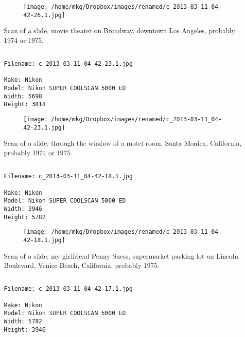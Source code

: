 \begin{figure}
\texttt{[image: /home/mkg/Dropbox/images/renamed/c\_2013-03-11\_04-42-26.1.jpg]}
\end{figure}
    
\clearpage
\onecolumn
\noindent Scan of a slide, movie theater on Broadway, downtown Los Angeles, probably 1974 or 1975.
\noindent
\begin{lstlisting}

Filename: c_2013-03-11_04-42-23.1.jpg

Make: Nikon
Model: Nikon SUPER COOLSCAN 5000 ED
Width: 5698
Height: 3818
\end{lstlisting}
\clearpage

\begin{figure}
\texttt{[image: /home/mkg/Dropbox/images/renamed/c\_2013-03-11\_04-42-23.1.jpg]}
\end{figure}
    
\clearpage
\onecolumn
\noindent Scan of a slide, through the window of a motel room, Santa Monica, California, probably 1974 or 1975.
\noindent
\begin{lstlisting}

Filename: c_2013-03-11_04-42-18.1.jpg

Make: Nikon
Model: Nikon SUPER COOLSCAN 5000 ED
Width: 3946
Height: 5782
\end{lstlisting}
\clearpage

\begin{figure}
\texttt{[image: /home/mkg/Dropbox/images/renamed/c\_2013-03-11\_04-42-18.1.jpg]}
\end{figure}
    
\clearpage
\onecolumn
\noindent Scan of a slide, my girlfriend Penny Suess, supermarket parking lot on Lincoln Boulevard, Venice Beach, California, probably 1975.
\noindent
\begin{lstlisting}

Filename: c_2013-03-11_04-42-17.1.jpg

Make: Nikon
Model: Nikon SUPER COOLSCAN 5000 ED
Width: 5782
Height: 3946
\end{lstlisting}
\clearpage

